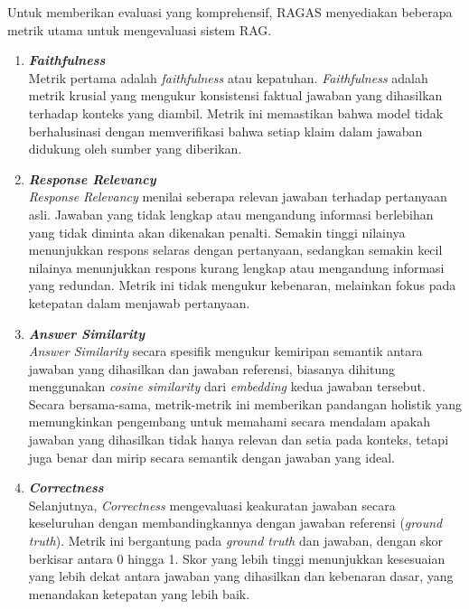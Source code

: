 Untuk memberikan evaluasi yang komprehensif, RAGAS menyediakan beberapa metrik utama untuk mengevaluasi sistem RAG.

\begin{enumerate}
	\item \textbf{\textit{Faithfulness}} \\
	      Metrik pertama adalah \textit{faithfulness} atau kepatuhan.
	      \textit{Faithfulness} adalah metrik krusial yang mengukur konsistensi faktual jawaban yang dihasilkan terhadap konteks yang diambil.
	      Metrik ini memastikan bahwa model tidak berhalusinasi dengan memverifikasi bahwa setiap klaim dalam jawaban didukung oleh sumber yang diberikan.
	\item \textbf{\textit{Response Relevancy}} \\
	      \textit{Response Relevancy} menilai seberapa relevan jawaban terhadap pertanyaan asli.
	      Jawaban yang tidak lengkap atau mengandung informasi berlebihan yang tidak diminta akan dikenakan penalti.
	      Semakin tinggi nilainya menunjukkan respons selaras dengan pertanyaan, sedangkan semakin kecil nilainya menunjukkan respons kurang lengkap atau mengandung informasi yang redundan.
	      Metrik ini tidak mengukur kebenaran, melainkan fokus pada ketepatan dalam menjawab pertanyaan.
	\item \textbf{\textit{Answer Similarity}} \\
	      \textit{Answer Similarity} secara spesifik mengukur kemiripan semantik antara jawaban yang dihasilkan dan jawaban referensi, biasanya dihitung menggunakan \textit{cosine similarity} dari \textit{embedding} kedua jawaban tersebut.
	      Secara bersama-sama, metrik-metrik ini memberikan pandangan holistik yang memungkinkan pengembang untuk memahami secara mendalam apakah jawaban yang dihasilkan tidak hanya relevan dan setia pada konteks, tetapi juga benar dan mirip secara semantik dengan jawaban yang ideal.
	\item \textbf{\textit{Correctness}} \\
	      Selanjutnya, \textit{Correctness} mengevaluasi keakuratan jawaban secara keseluruhan dengan membandingkannya dengan jawaban referensi (\textit{ground truth}).
	      Metrik ini bergantung pada \textit{ground truth} dan jawaban, dengan skor berkisar antara 0 hingga 1.
	      Skor yang lebih tinggi menunjukkan kesesuaian yang lebih dekat antara jawaban yang dihasilkan dan kebenaran dasar, yang menandakan ketepatan yang lebih baik.
\end{enumerate}


